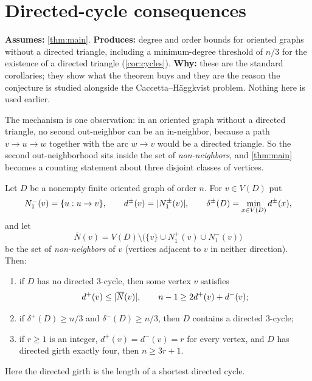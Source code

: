 \section{Directed-cycle consequences}\label{sec:cycles}

\begin{contract}
\textbf{Assumes:} \cref{thm:main}. \quad
\textbf{Produces:} degree and order bounds for oriented graphs without a directed triangle, including
a minimum-degree threshold of $n/3$ for the existence of a directed triangle
(\cref{cor:cycles}). \textbf{Why:} these are the standard corollaries; they show what the theorem buys
and they are the reason the conjecture is studied alongside the Caccetta--H\"aggkvist problem.
Nothing here is used earlier.
\end{contract}

The mechanism is one observation: in an oriented graph without a directed triangle, no second
out-neighbor can be an in-neighbor, because a path $v\to u\to w$ together with the arc $w\to v$ would
be a directed triangle. So the second out-neighborhood sits inside the set of \emph{non-neighbors},
and \cref{thm:main} becomes a counting statement about three disjoint classes of vertices.

\begin{corollary}\label{cor:cycles}
Let $D$ be a nonempty finite oriented graph of order $n$. For $v\in V(D)$ put
\[
 N_1^-(v)=\{u:u\to v\},\qquad d^\pm(v)=\lvert N_1^\pm(v)\rvert,\qquad
 \delta^\pm(D)=\min_{x\in V(D)}d^\pm(x),
\]
and let
\[
 \overline N(v)=V(D)\setminus\bigl(\{v\}\cup N_1^+(v)\cup N_1^-(v)\bigr)
\]
be the set of \emph{non-neighbors} of $v$ (vertices adjacent to $v$ in neither direction). Then:
\begin{enumerate}[label=\textup{(\roman*)},leftmargin=1.6em,itemsep=3pt]
\item if $D$ has no directed $3$-cycle, then some vertex $v$ satisfies
  \[
   d^+(v)\le\lvert \overline N(v)\rvert,\qquad n-1\ge2d^+(v)+d^-(v);
  \]
\item if $\delta^+(D)\ge n/3$ and $\delta^-(D)\ge n/3$, then $D$ contains a directed $3$-cycle;
\item if $r\ge1$ is an integer, $d^+(v)=d^-(v)=r$ for every vertex, and $D$ has directed girth
  exactly four, then $n\ge3r+1$.
\end{enumerate}
Here the directed girth is the length of a shortest directed cycle.
\end{corollary}


